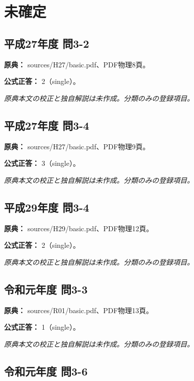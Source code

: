 \section{未確定}

\subsection{平成27年度 問3-2}
\label{q:h27-reg-basic-3-2}

\noindent\textbf{原典：} sources/H27/basic.pdf、PDF物理8頁。

\textbf{公式正答：} 2（single）。

\par\textit{原典本文の校正と独自解説は未作成。分類のみの登録項目。}

\subsection{平成27年度 問3-4}
\label{q:h27-reg-basic-3-4}

\noindent\textbf{原典：} sources/H27/basic.pdf、PDF物理9頁。

\textbf{公式正答：} 3（single）。

\par\textit{原典本文の校正と独自解説は未作成。分類のみの登録項目。}

\subsection{平成29年度 問3-4}
\label{q:h29-reg-basic-3-4}

\noindent\textbf{原典：} sources/H29/basic.pdf、PDF物理12頁。

\textbf{公式正答：} 2（single）。

\par\textit{原典本文の校正と独自解説は未作成。分類のみの登録項目。}

\subsection{令和元年度 問3-3}
\label{q:r01-reg-basic-3-3}

\noindent\textbf{原典：} sources/R01/basic.pdf、PDF物理13頁。

\textbf{公式正答：} 1（single）。

\par\textit{原典本文の校正と独自解説は未作成。分類のみの登録項目。}

\subsection{令和元年度 問3-6}
\label{q:r01-reg-basic-3-6}

